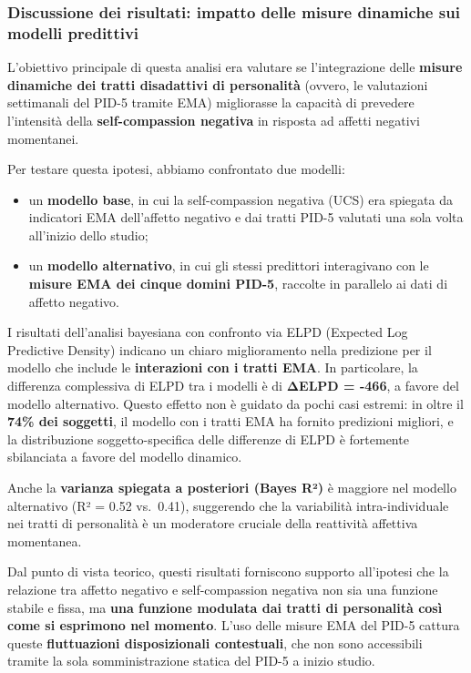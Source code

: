 \documentclass[
  11pt,
  a4paper,
  onecolumn]{article}
\providecommand{\tightlist}{%
  \setlength{\itemsep}{0pt}\setlength{\parskip}{0pt}}
\begin{document}
\subsubsection{Discussione dei risultati: impatto delle misure dinamiche
sui modelli
predittivi}\label{discussione-dei-risultati-impatto-delle-misure-dinamiche-sui-modelli-predittivi}

L'obiettivo principale di questa analisi era valutare se l'integrazione
delle \textbf{misure dinamiche dei tratti disadattivi di personalità}
(ovvero, le valutazioni settimanali del PID-5 tramite EMA) migliorasse
la capacità di prevedere l'intensità della \textbf{self-compassion
negativa} in risposta ad affetti negativi momentanei.

Per testare questa ipotesi, abbiamo confrontato due modelli:

\begin{itemize}
\tightlist
\item
  un \textbf{modello base}, in cui la self-compassion negativa (UCS) era
  spiegata da indicatori EMA dell'affetto negativo e dai tratti PID-5
  valutati una sola volta all'inizio dello studio;
\item
  un \textbf{modello alternativo}, in cui gli stessi predittori
  interagivano con le \textbf{misure EMA dei cinque domini PID-5},
  raccolte in parallelo ai dati di affetto negativo.
\end{itemize}

I risultati dell'analisi bayesiana con confronto via ELPD (Expected Log
Predictive Density) indicano un chiaro miglioramento nella predizione
per il modello che include le \textbf{interazioni con i tratti EMA}. In
particolare, la differenza complessiva di ELPD tra i modelli è di
\textbf{ΔELPD = -466}, a favore del modello alternativo. Questo effetto
non è guidato da pochi casi estremi: in oltre il \textbf{74\% dei
soggetti}, il modello con i tratti EMA ha fornito predizioni migliori, e
la distribuzione soggetto-specifica delle differenze di ELPD è
fortemente sbilanciata a favore del modello dinamico.

Anche la \textbf{varianza spiegata a posteriori (Bayes R²)} è maggiore
nel modello alternativo (R² = 0.52 vs.~0.41), suggerendo che la
variabilità intra-individuale nei tratti di personalità è un moderatore
cruciale della reattività affettiva momentanea.

Dal punto di vista teorico, questi risultati forniscono supporto
all'ipotesi che la relazione tra affetto negativo e self-compassion
negativa non sia una funzione stabile e fissa, ma \textbf{una funzione
modulata dai tratti di personalità così come si esprimono nel momento}.
L'uso delle misure EMA del PID-5 cattura queste \textbf{fluttuazioni
disposizionali contestuali}, che non sono accessibili tramite la sola
somministrazione statica del PID-5 a inizio studio.
\end{document}
